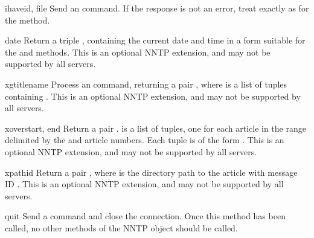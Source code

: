 \begin{methoddesc}{ihave}{id, file}
Send an  command.  If the response is not an error, treat
 exactly as for the  method.
\end{methoddesc}

\begin{methoddesc}{date}{}
Return a triple ,
containing the current date and time in a form suitable for the
 and  methods.
This is an optional NNTP extension, and may not be supported by all
servers.
\end{methoddesc}

\begin{methoddesc}{xgtitle}{name}
Process an  command, returning a pair , where  is a list of tuples containing
.
This is an optional NNTP extension, and may not be supported by all
servers.
\end{methoddesc}

\begin{methoddesc}{xover}{start, end}
Return a pair .   is a list
of tuples, one for each article in the range delimited by the 
and  article numbers.  Each tuple is of the form
\code{(}\code{,} \code{,}
\code{,} \code{,} \code{,}
\code{,} \code{,} \code{)}.
This is an optional NNTP extension, and may not be supported by all
servers.
\end{methoddesc}

\begin{methoddesc}{xpath}{id}
Return a pair , where  is the
directory path to the article with message ID .  This is an
optional NNTP extension, and may not be supported by all servers.
\end{methoddesc}

\begin{methoddesc}{quit}{}
Send a  command and close the connection.  Once this method
has been called, no other methods of the NNTP object should be called.
\end{methoddesc}
